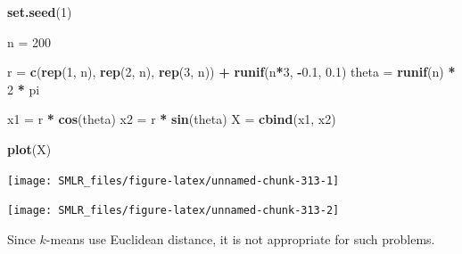 \documentclass[
]{book}
\newenvironment{Shaded}{\begin{snugshade}}{\end{snugshade}}
\newcommand{\AttributeTok}[1]{\textcolor[rgb]{0.13,0.29,0.53}{#1}}
\newcommand{\DecValTok}[1]{\textcolor[rgb]{0.00,0.00,0.81}{#1}}
\newcommand{\FloatTok}[1]{\textcolor[rgb]{0.00,0.00,0.81}{#1}}
\newcommand{\FunctionTok}[1]{\textcolor[rgb]{0.13,0.29,0.53}{\textbf{#1}}}
\newcommand{\NormalTok}[1]{#1}
\newcommand{\OtherTok}[1]{\textcolor[rgb]{0.56,0.35,0.01}{#1}}
\newcommand{\SpecialCharTok}[1]{\textcolor[rgb]{0.81,0.36,0.00}{\textbf{#1}}}
\theoremstyle{definition}
\theoremstyle{definition}
\theoremstyle{definition}
\theoremstyle{definition}
\theoremstyle{remark}
\begin{document}
\begin{Shaded}
\begin{Highlighting}[]
  \FunctionTok{set.seed}\NormalTok{(}\DecValTok{1}\NormalTok{)}

\NormalTok{  n }\OtherTok{=} \DecValTok{200}
  
\NormalTok{  r }\OtherTok{=} \FunctionTok{c}\NormalTok{(}\FunctionTok{rep}\NormalTok{(}\DecValTok{1}\NormalTok{, n), }\FunctionTok{rep}\NormalTok{(}\DecValTok{2}\NormalTok{, n), }\FunctionTok{rep}\NormalTok{(}\DecValTok{3}\NormalTok{, n)) }\SpecialCharTok{+} \FunctionTok{runif}\NormalTok{(n}\SpecialCharTok{*}\DecValTok{3}\NormalTok{, }\SpecialCharTok{{-}}\FloatTok{0.1}\NormalTok{, }\FloatTok{0.1}\NormalTok{)}
\NormalTok{  theta }\OtherTok{=} \FunctionTok{runif}\NormalTok{(n) }\SpecialCharTok{*} \DecValTok{2} \SpecialCharTok{*}\NormalTok{ pi}

\NormalTok{  x1 }\OtherTok{=}\NormalTok{ r }\SpecialCharTok{*} \FunctionTok{cos}\NormalTok{(theta)}
\NormalTok{  x2 }\OtherTok{=}\NormalTok{ r }\SpecialCharTok{*} \FunctionTok{sin}\NormalTok{(theta)}
\NormalTok{  X }\OtherTok{=} \FunctionTok{cbind}\NormalTok{(x1, x2)}
  
  \FunctionTok{plot}\NormalTok{(X)}
\end{Highlighting}
\end{Shaded}

\begin{center}\texttt{[image: SMLR\_files/figure-latex/unnamed-chunk-313-1]} \end{center}

\begin{Shaded}
\end{Shaded}

\begin{center}\texttt{[image: SMLR\_files/figure-latex/unnamed-chunk-313-2]} \end{center}

Since \(k\)-means use Euclidean distance, it is not appropriate for such problems.
\end{document}
